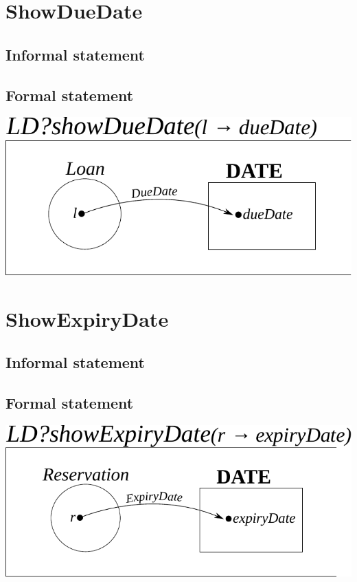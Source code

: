 \documentclass[]{report}
\begin{document}
\section{ShowDueDate}
\subsection{Informal statement}
\subsection{Formal statement}
\begin{center}
	\includegraphics[scale=0.75]{show_due_date.pdf}
\end{center}
\newpage
\section{ShowExpiryDate}
\subsection{Informal statement}
\subsection{Formal statement}
\begin{center}
	\includegraphics[scale=0.75]{show_expiry_date.pdf}
\end{center}
\newpage
\end{document}

